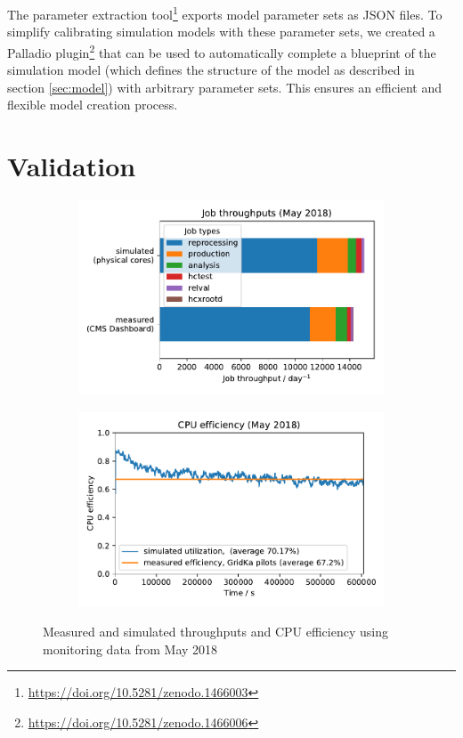 \documentclass{webofc}
\newcommand{\footurl}[1]{\footnote{\url{#1}}}
\begin{document}
The parameter extraction tool\footurl{https://doi.org/10.5281/zenodo.1466003} exports model parameter sets as JSON files.
To simplify calibrating simulation models with these parameter sets, we created a Palladio plugin\footurl{https://doi.org/10.5281/zenodo.1466006} that can be used to automatically complete a blueprint of the simulation model (which defines the structure of the model as described in section \ref{sec:model}) with arbitrary parameter sets.
This ensures an efficient and flexible model creation process.

\section{Validation}
\label{validation}

\begin{figure}[h]
	\centering
	\vspace{-10px}
	\begin{subfigure}{0.48\linewidth}
		\includegraphics[width=\linewidth]{images/validation/throughputs}
	\end{subfigure}
	\begin{subfigure}{0.48\linewidth}
		\includegraphics[width=\linewidth]{images/validation/utilizations}
	\end{subfigure}
	\vspace{-10px}
	\caption{Measured and simulated throughputs and CPU efficiency using monitoring data from May 2018}
	\label{fig:validation}
\end{figure}
\end{document}
